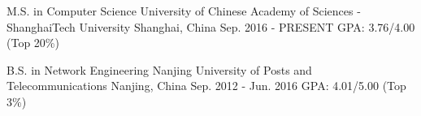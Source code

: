 


\begin{cventries}


\cventry
{M.S. in Computer Science } %
{University of Chinese Academy of Sciences - ShanghaiTech University} %
{Shanghai, China} %
{Sep. 2016 - PRESENT} %
{GPA: 3.76/4.00 (Top 20\%)}

\cventry
{B.S. in Network Engineering}
{Nanjing University of Posts and Telecommunications}
{Nanjing, China}
{Sep. 2012 - Jun. 2016}
{GPA: 4.01/5.00 (Top 3\%)}

\end{cventries}